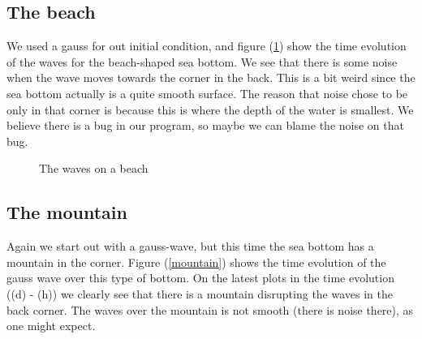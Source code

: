 \subsection{The beach}
 We used a gauss for out initial condition, and figure (\ref{beach}) show the time evolution of the waves for the beach-shaped sea bottom. We see that there is some noise when the wave moves towards the corner in the back. This is a bit weird 
since the sea bottom actually is a quite smooth surface. The reason that noise chose to be only in that corner
is because this is where the depth of the water is smallest. We believe there is a bug in our program, so maybe we can blame the noise on that bug.
 \begin{figure}[H]
\caption{The waves on a beach}
\label{beach}

\end{figure}





\subsection{The mountain}
Again we start out with a gauss-wave, but this time the sea bottom has a mountain in the corner. Figure (\ref{mountain})
shows the time evolution of the gauss wave over this type of bottom.
On the latest
plots in the time evolution ((d) - (h)) we clearly see that there is a mountain disrupting the waves in the back corner.
The waves over the mountain is not smooth (there is noise there), as one might expect.

